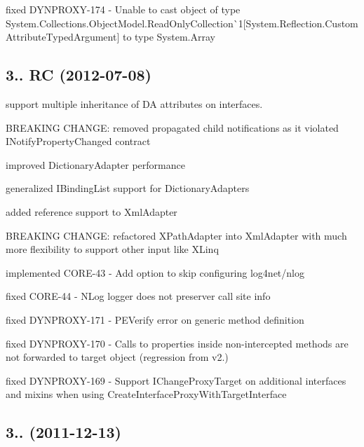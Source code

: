 \begin{DoxyItemize}
\item fixed D\+Y\+N\+P\+R\+O\+X\+Y-\/174 -\/ Unable to cast object of type \textquotesingle{}System.\+Collections.\+Object\+Model.\+Read\+Only\+Collection\`{}1\mbox{[}System.\+Reflection.\+Custom\+Attribute\+Typed\+Argument\mbox{]}\textquotesingle{} to type \textquotesingle{}System.\+Array\textquotesingle{}
\end{DoxyItemize}

\subsection*{3.. RC (2012-\/07-\/08)}


\begin{DoxyItemize}
\item support multiple inheritance of DA attributes on interfaces.
\item B\+R\+E\+A\+K\+I\+NG C\+H\+A\+N\+GE\+: removed propagated child notifications as it violated I\+Notify\+Property\+Changed contract
\item improved Dictionary\+Adapter performance
\item generalized I\+Binding\+List support for Dictionary\+Adapters
\item added reference support to Xml\+Adapter
\item B\+R\+E\+A\+K\+I\+NG C\+H\+A\+N\+GE\+: refactored X\+Path\+Adapter into Xml\+Adapter with much more flexibility to support other input like X\+Linq
\item implemented C\+O\+R\+E-\/43 -\/ Add option to skip configuring log4net/nlog
\item fixed C\+O\+R\+E-\/44 -\/ N\+Log logger does not preserver call site info
\item fixed D\+Y\+N\+P\+R\+O\+X\+Y-\/171 -\/ P\+E\+Verify error on generic method definition
\item fixed D\+Y\+N\+P\+R\+O\+X\+Y-\/170 -\/ Calls to properties inside non-\/intercepted methods are not forwarded to target object (regression from v2.)
\item fixed D\+Y\+N\+P\+R\+O\+X\+Y-\/169 -\/ Support I\+Change\+Proxy\+Target on additional interfaces and mixins when using Create\+Interface\+Proxy\+With\+Target\+Interface
\end{DoxyItemize}

\subsection*{3.. (2011-\/12-\/13)}


